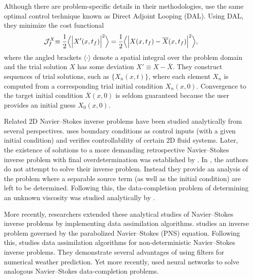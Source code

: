 \documentclass[%
 reprint,
 amsmath,amssymb,
 aps,
 pre,
]{revtex4-2}
\newcommand{\J}{\mathcal{J}}
\begin{document}
Although there are problem-specific details in their methodologies, \cite{Lukyanenko2021, Subramanian2020, Kabanikhin2020, Liu2008, Li2017} use the same optimal control technique known as Direct Adjoint Looping (DAL). 
Using DAL, they minimize the cost functional
\begin{align}
    \hspace{-0.2cm}\J_f^X \hspace{-0.1cm} &\equiv \frac{1}{2} \Big\langle\Big| X'(x, t_f) \Big|^2\Big\rangle = \frac{1}{2} \Big\langle\Big| X(x, t_f) - \overline{X}(x, t_f) \Big|^2\Big\rangle, \label{costintro}
\end{align}
where the angled brackets $\langle \cdot \rangle$ denote a spatial integral over the problem domain and the trial solution $X$ has some deviation $X' \equiv X - \overline{X}$.
They construct sequences of trial solutions, such as $\{X_{n}(x, t)\}$, where each element $X_{n}$ is computed from a corresponding trial initial condition $X_{n}(x, 0)$.
Convergence to the target initial condition $\overline{X}(x, 0)$ is seldom guaranteed because the user provides an initial guess $X_{0}(x, 0)$.

Related 2D Navier--Stokes inverse problems have been studied analytically from several perspectives.
\cite{Imanuvilov1997} uses boundary conditions as control inputs (with a given initial condition) and verifies controllability of certain 2D fluid systems.
Later, the existence of solutions to a more demanding retrospective Navier--Stokes inverse problem with final overdetermination was established by \cite{Fan2009}.
In \cite{Fan2009}, the authors do not attempt to solve their inverse problem.
Instead they provide an analysis of the problem where a separable source term (as well as the initial condition) are left to be determined. 
Following this, the data-completion problem of determining an unknown viscosity was studied analytically by \cite{Fan2010}.

More recently, researchers extended these analytical studies of Navier--Stokes inverse problems by implementing data assimilation algorithms.
\cite{Du2013} studies an inverse problem governed by the parabolized Navier--Stokes (PNS) equation.
Following this, \cite{Law2012} studies data assimilation algorithms for non-deterministic Navier--Stokes inverse problems. 
They demonstrate several advantages of using filters for numerical weather prediction.
Yet more recently, \cite{Fan2020, FrerixThomas2021VDAw, Zhao2022, mowlavi_optimal_2023} used neural networks to solve analogous Navier--Stokes data-completion problems.
\end{document}
